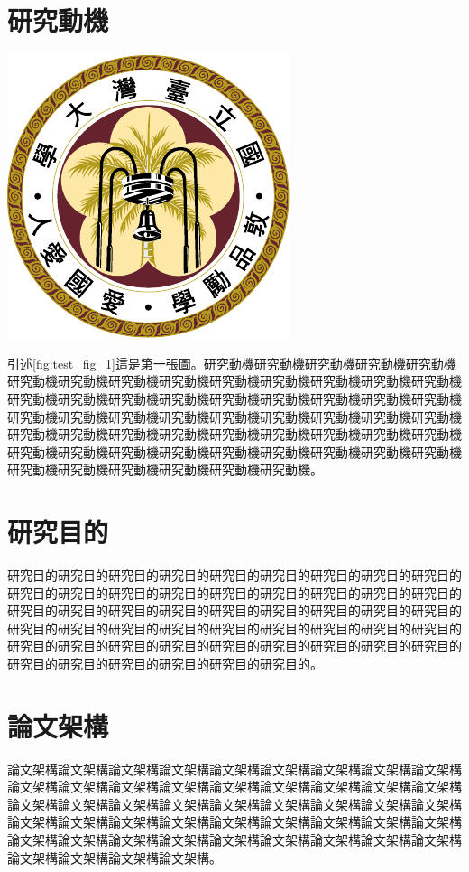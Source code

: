 \section{研究動機}
\begingroup
\centering
\includegraphics{figures/seal.pdf}
\captionsetup{type=figure}
\label{fig:test_fig_1}
\endgroup

引述\ref{fig:test_fig_1}這是第一張圖。研究動機研究動機研究動機研究動機研究動機研究動機研究動機研究動機研究動機研究動機研究動機研究動機研究動機研究動機研究動機研究動機研究動機研究動機研究動機研究動機研究動機研究動機研究動機研究動機研究動機研究動機研究動機研究動機研究動機研究動機研究動機研究動機研究動機研究動機研究動機研究動機研究動機研究動機研究動機研究動機研究動機研究動機研究動機研究動機研究動機研究動機研究動機研究動機研究動機研究動機研究動機研究動機研究動機研究動機研究動機研究動機。


\section{研究目的}

研究目的研究目的研究目的研究目的研究目的研究目的研究目的研究目的研究目的研究目的研究目的研究目的研究目的研究目的研究目的研究目的研究目的研究目的研究目的研究目的研究目的研究目的研究目的研究目的研究目的研究目的研究目的研究目的研究目的研究目的研究目的研究目的研究目的研究目的研究目的研究目的研究目的研究目的研究目的研究目的研究目的研究目的研究目的研究目的研究目的研究目的研究目的研究目的研究目的研究目的研究目的。


\section{論文架構}
論文架構論文架構論文架構論文架構論文架構論文架構論文架構論文架構論文架構論文架構論文架構論文架構論文架構論文架構論文架構論文架構論文架構論文架構論文架構論文架構論文架構論文架構論文架構論文架構論文架構論文架構論文架構論文架構論文架構論文架構論文架構論文架構論文架構論文架構論文架構論文架構論文架構論文架構論文架構論文架構論文架構論文架構論文架構論文架構論文架構論文架構論文架構論文架構論文架構。